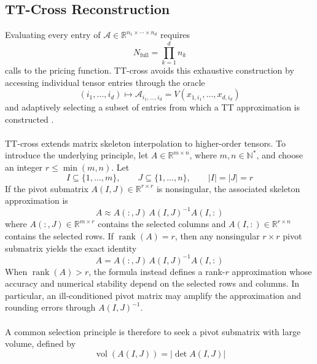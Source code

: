 \documentclass{article}
\numberwithin{equation}{subsection}
\theoremstyle{definition}
\theoremstyle{remark}
\begin{document}
\subsection{TT-Cross Reconstruction}
\label{subsec:tt-cross}
Evaluating every entry of
\(\mathcal{A}\in\mathbb{R}^{n_1\times\cdots\times n_d}\)
requires
\begin{equation}
N_{\mathrm{full}} = \prod_{k=1}^{d} n_k
\end{equation}
calls to the pricing function. TT-cross avoids this exhaustive construction by
accessing individual tensor entries through the oracle
\begin{equation}
(i_1,\ldots,i_d) \longmapsto \mathcal{A}_{i_1,\ldots,i_d} = V(x_{1,i_1},\ldots,x_{d,i_d})
\end{equation}
and adaptively selecting a subset of entries from which a TT approximation is
constructed \cite{oseledets2010ttcross}.\\
\\
TT-cross extends matrix skeleton interpolation to higher-order tensors. To
introduce the underlying principle, let
\(A\in\mathbb{R}^{m\times n}\), where \(m,n\in\mathbb{N}^{*}\), and choose an
integer \(r\leq\min(m,n)\). Let
\begin{equation}
I\subseteq\{1,\ldots,m\},
\qquad
J\subseteq\{1,\ldots,n\},
\qquad
|I|=|J|=r
\end{equation}
If the pivot submatrix \(A(I,J)\in\mathbb{R}^{r\times r}\) is nonsingular, the
associated skeleton approximation is
\begin{equation}
A \approx A(:,J)\,A(I,J)^{-1}A(I,:)
\end{equation}
where \(A(:,J)\in\mathbb{R}^{m\times r}\) contains the selected columns and
\(A(I,:)\in\mathbb{R}^{r\times n}\) contains the selected rows.
If \(\operatorname{rank}(A)=r\), then any nonsingular \(r\times r\) pivot
submatrix yields the exact identity
\begin{equation}
A = A(:,J)\,A(I,J)^{-1}A(I,:)
\end{equation}
When \(\operatorname{rank}(A)>r\), the formula instead defines a rank-\(r\)
approximation whose accuracy and numerical stability depend on the selected
rows and columns. In particular, an ill-conditioned pivot matrix may amplify
the approximation and rounding errors through \(A(I,J)^{-1}\).\\
\\
A common selection principle is therefore to seek a pivot submatrix with large
volume, defined by
\begin{equation}
\operatorname{vol}\!\left(A(I,J)\right) = \left|\det A(I,J)\right|
\end{equation}
\end{document}
